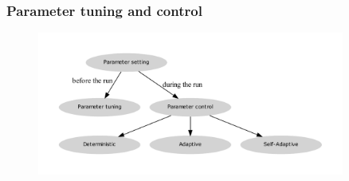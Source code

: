 \begin{frame}
	\frametitle{Parameter tuning and control}
	
	\begin{figure}
		\includegraphics[width=0.9\textwidth]{figures/flowchart_parameter_control}
	\end{figure}
	\cite{Eiben.1999}
	
\end{frame}

